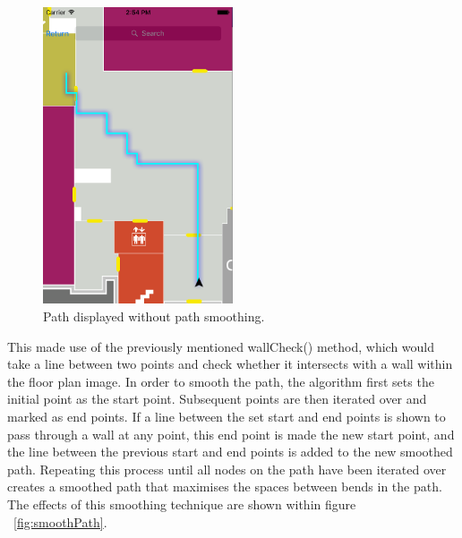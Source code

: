 \documentclass[12pt,a4paper]{report}
\begin{document}
\begin{figure}[]
\center
\includegraphics[width=0.5\textwidth]{images/jaggedPath.png}
\caption{Path displayed without path smoothing.}
\label{fig:jaggedPath}
\end{figure}


This made use of the previously mentioned wallCheck() method, which would take a line between two points and check whether it intersects with a wall within the floor plan image. In order to smooth the path, the algorithm first sets the initial point as the start point. Subsequent points are then iterated over and marked as end points. If a line between the set start and end points is shown to pass through a wall at any point, this end point is made the new start point, and the line between the previous start and end points is added to the new smoothed path. Repeating this process until all nodes on the path have been iterated over creates a smoothed path that maximises the spaces between bends in the path. The effects of this smoothing technique are shown within figure ~\ref{fig:smoothPath}.
\end{document}
